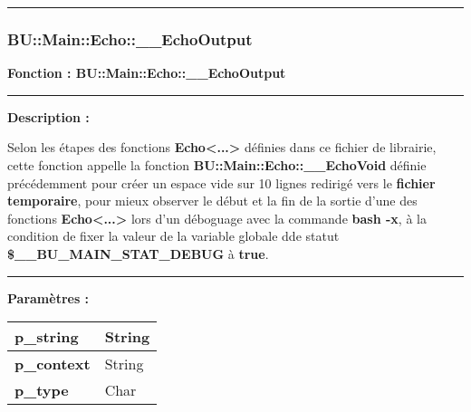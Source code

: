 \documentclass[a4paper,10pt]{article}
\begin{document}


\color{sec3}\par\noindent\rule{\textwidth}{0.4pt}\color{text}\setlength{\parskip}{1em}

\color{sec3}
\subsubsection{BU::Main::Echo::\_\_EchoOutput}\color{text}

\begin{justify}
    \textbf{Fonction : \color{func}BU::Main::Echo::\_\_EchoOutput}
\end{justify}


\par\noindent\rule{\textwidth}{0.4pt}

\begin{justify}
    \textbf{Description :}

    Selon les étapes des fonctions \textbf{\color{func}Echo<...>} définies dans ce fichier de librairie, cette fonction appelle la fonction \textbf{\color{func}BU::Main::Echo::\_\_EchoVoid} définie précédemment pour créer un espace vide sur 10 lignes redirigé vers le \textbf{\color{path}fichier temporaire}, pour mieux observer le début et la fin de la sortie d'une des fonctions \textbf{\color{func}Echo<...>} lors d'un déboguage avec la commande \textbf{\color{cmds}bash -x}, à la condition de fixer la valeur de la variable globale dde statut \textbf{\color{vars}\$\_\_BU\_MAIN\_STAT\_DEBUG} à \textbf{true}.
\end{justify}


\par\noindent\rule{\textwidth}{0.4pt}

\begin{justify}
    \textbf{Paramètres :}

    \begin{tabular}{|l|l|}
        \hline
        \textbf{\color{vars}p\_string} & String\\
        \hline
        \textbf{\color{vars}p\_context} & String\\
        \hline
        \textbf{\color{vars}p\_type} & Char\\
        \hline
    \end{tabular}
\end{justify}
\end{document}

